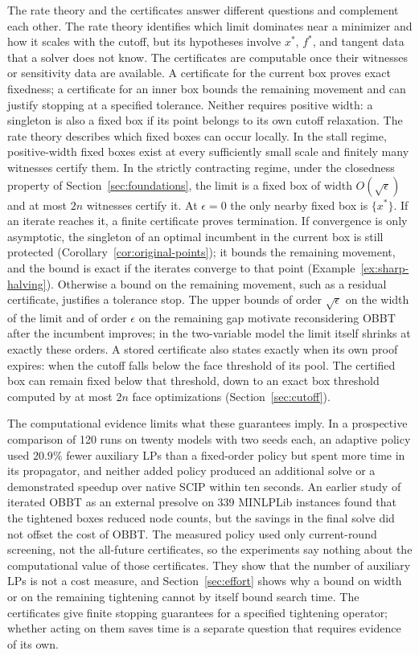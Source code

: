 The rate theory and the certificates answer different questions and
complement each other. The rate theory identifies which limit dominates near
a minimizer and how it scales with the cutoff, but its hypotheses involve
$x^*$, $f^*$, and tangent data that a solver does not know. The certificates
are computable once their witnesses or sensitivity data are available. A
certificate for the current box proves exact fixedness; a certificate for
an inner box bounds the remaining movement and can justify stopping at a
specified tolerance. Neither requires positive width: a singleton is also
a fixed box if its point belongs to its own cutoff relaxation. The rate
theory describes which fixed boxes can occur locally. In the stall regime,
positive-width fixed boxes exist at every sufficiently small scale and
finitely many witnesses certify them. In the strictly contracting regime,
under the closedness property of Section~\ref{sec:foundations}, the limit is
a fixed box of width $O(\sqrt\epsilon)$ and at most $2n$ witnesses certify
it. At $\epsilon=0$ the only nearby fixed box is $\{x^*\}$. If an iterate
reaches it, a finite certificate proves termination. If convergence is only
asymptotic, the singleton of an optimal incumbent in the current box is
still protected (Corollary~\ref{cor:original-points}); it bounds the
remaining movement, and the bound is exact if the iterates converge to that point
(Example~\ref{ex:sharp-halving}). Otherwise a bound on the remaining
movement, such as a residual certificate, justifies a tolerance stop. The
upper bounds of order $\sqrt\epsilon$ on the width of the limit and of
order $\epsilon$ on the remaining gap motivate reconsidering OBBT after the
incumbent improves; in the two-variable model the limit itself shrinks at
exactly these orders. A stored certificate also
states exactly when its own proof expires: when the cutoff falls below the
face threshold of its pool. The certified box can remain fixed below that
threshold, down to an exact box threshold computed by at most $2n$ face
optimizations (Section~\ref{sec:cutoff}).

The computational evidence limits what these guarantees imply. In a
prospective comparison of 120 runs on twenty models with two seeds each, an
adaptive policy used $20.9\%$ fewer auxiliary LPs than a fixed-order policy
but spent more time in its propagator, and neither added policy produced an
additional solve or a demonstrated speedup over native SCIP within ten
seconds. An earlier study of iterated OBBT as an external presolve on 339
MINLPLib instances found that the tightened boxes reduced node counts, but
the savings in the final solve did not offset the cost of OBBT. The
measured policy used only current-round screening, not the all-future
certificates, so the experiments say nothing about the computational value
of those certificates. They show that the number of auxiliary LPs is not a
cost measure, and Section~\ref{sec:effort} shows why a bound on width or on
the remaining tightening cannot by itself bound search time. The certificates
give finite stopping guarantees for a specified tightening operator; whether
acting on them saves time is a separate question that requires evidence of
its own.

